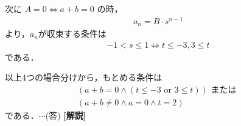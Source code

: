 \documentclass[a4paper,10pt]{ltjsarticle}
\begin{document}
\begin{multicols}{2}
  次に $A=0 \iff a+b=0$ の時，
  \begin{align*}
    a_n = B \cdot s^{n-1}
  \end{align*}
  より，$a_n$が収束する条件は
  \begin{align*}
    -1 < s \le 1 \iff t \le -3, 3 \le t
  \end{align*}
  である．

  以上4つの場合分けから，もとめる条件は
  \begin{align*}
    (a+b=0 \land (t \le -3 \text{ or } 3 \le t)) \text{ または } \\
    (a+b \ne 0 \land a=0 \land t = 2)
  \end{align*}
  である．$\cdots$(答)
  \vspace{10pt}
  {\bf[解説]}

  \newpage
\end{multicols}
\end{document}
